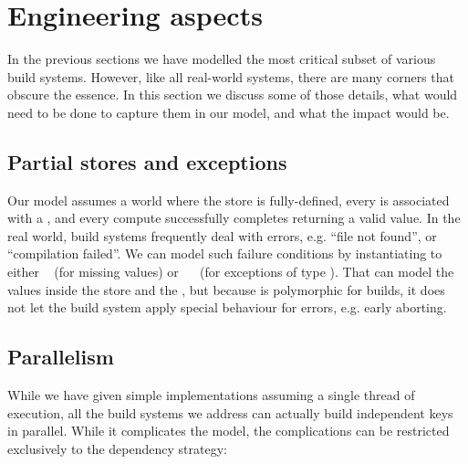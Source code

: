 \section{Engineering aspects}\label{sec-engineering}

In the previous sections we have modelled the most critical subset of various
build systems. However, like all real-world systems, there are many corners that
obscure the essence. In this section we discuss some of those details, what
would need to be done to capture them in our model, and what the impact would be.

\subsection{Partial stores and exceptions}

Our model assumes a world where the store is fully-defined, every  is
associated with a , and every compute successfully completes returning a
valid value. In the real world, build systems frequently deal with errors, e.g.
``file not found'', or ``compilation failed''. We can model such failure
conditions by instantiating  to either ~ (for missing
values) or ~~ (for exceptions of type ). That can
model the values inside the store and the , but because  is
polymorphic for builds, it does not let the build system apply special behaviour
for errors, e.g. early aborting.


\subsection{Parallelism}\label{sec-parallelism}

While we have given simple implementations assuming a single thread of execution,
all the build systems we address can actually build independent keys in parallel.
While it complicates the model, the complications can be restricted exclusively
to the dependency strategy:

